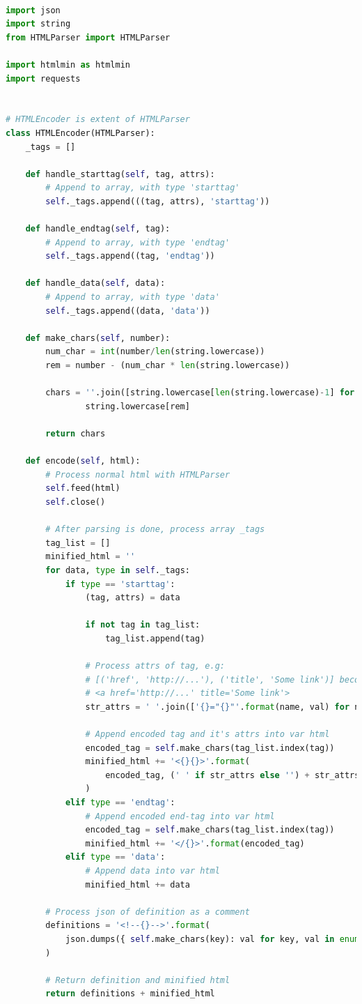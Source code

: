 \documentclass[letterpaper,11pt]{article}
\begin{document}
\begin{lstlisting}[language=python, caption={Encoder for HTML-tag Compressing }, label={lst:tag-compressing-encoder}]
 
import json
import string
from HTMLParser import HTMLParser

import htmlmin as htmlmin
import requests


# HTMLEncoder is extent of HTMLParser
class HTMLEncoder(HTMLParser):
    _tags = []

    def handle_starttag(self, tag, attrs):
        # Append to array, with type 'starttag'
        self._tags.append(((tag, attrs), 'starttag'))

    def handle_endtag(self, tag):
        # Append to array, with type 'endtag'
        self._tags.append((tag, 'endtag'))

    def handle_data(self, data):
        # Append to array, with type 'data'
        self._tags.append((data, 'data'))

    def make_chars(self, number):
        num_char = int(number/len(string.lowercase))
        rem = number - (num_char * len(string.lowercase))

        chars = ''.join([string.lowercase[len(string.lowercase)-1] for i in range(0,num_char)]) + \
                string.lowercase[rem]

        return chars

    def encode(self, html):
        # Process normal html with HTMLParser
        self.feed(html)
        self.close()

        # After parsing is done, process array _tags
        tag_list = []
        minified_html = ''
        for data, type in self._tags:
            if type == 'starttag':
                (tag, attrs) = data

                if not tag in tag_list:
                    tag_list.append(tag)

                # Process attrs of tag, e.g:
                # [('href', 'http://...'), ('title', 'Some link')] become
                # <a href='http://...' title='Some link'>
                str_attrs = ' '.join(['{}="{}"'.format(name, val) for name, val in attrs])

                # Append encoded tag and it's attrs into var html
                encoded_tag = self.make_chars(tag_list.index(tag))
                minified_html += '<{}{}>'.format(
                    encoded_tag, (' ' if str_attrs else '') + str_attrs
                )
            elif type == 'endtag':
                # Append encoded end-tag into var html
                encoded_tag = self.make_chars(tag_list.index(tag))
                minified_html += '</{}>'.format(encoded_tag)
            elif type == 'data':
                # Append data into var html
                minified_html += data

        # Process json of definition as a comment
        definitions = '<!--{}-->'.format(
            json.dumps({ self.make_chars(key): val for key, val in enumerate(tag_list) })
        )

        # Return definition and minified html
        return definitions + minified_html

\end{lstlisting}	
\end{document}
